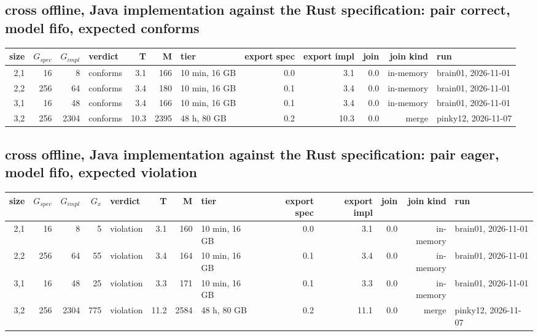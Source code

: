 \documentclass[10pt]{article}
\begin{document}
\subsection*{cross offline, Java implementation against the Rust specification: pair \textsf{correct}, model fifo, expected conforms}
\begin{longtable}{@{}rrrlrrlrrrrl@{}}
\toprule
size & $G_{\mathit{spec}}$ & $G_{\mathit{impl}}$ & verdict & T & M & tier & export spec & export impl & join & join kind & run \\
\midrule
\endhead
\color{red} 2,1 & 16 & 8 & conforms & 3.1 & 166 & 10 min, 16 GB & 0.0 & 3.1 & 0.0 & in-memory & brain01, 2026-11-01 \\
\color{red} 2,2 & 256 & 64 & conforms & 3.4 & 180 & 10 min, 16 GB & 0.1 & 3.4 & 0.0 & in-memory & brain01, 2026-11-01 \\
\color{red} 3,1 & 16 & 48 & conforms & 3.4 & 166 & 10 min, 16 GB & 0.1 & 3.4 & 0.0 & in-memory & brain01, 2026-11-01 \\
\color{red} 3,2 & 256 & 2304 & conforms & 10.3 & 2395 & 48 h, 80 GB & 0.2 & 10.3 & 0.0 & merge & pinky12, 2026-11-07 \\
\bottomrule
\end{longtable}
\subsection*{cross offline, Java implementation against the Rust specification: pair \textsf{eager}, model fifo, expected violation}
\begin{longtable}{@{}rrrrlrrlrrrrl@{}}
\toprule
size & $G_{\mathit{spec}}$ & $G_{\mathit{impl}}$ & $G_x$ & verdict & T & M & tier & export spec & export impl & join & join kind & run \\
\midrule
\endhead
\color{red} 2,1 & 16 & 8 & 5 & violation & 3.1 & 160 & 10 min, 16 GB & 0.0 & 3.1 & 0.0 & in-memory & brain01, 2026-11-01 \\
\color{red} 2,2 & 256 & 64 & 55 & violation & 3.4 & 164 & 10 min, 16 GB & 0.1 & 3.4 & 0.0 & in-memory & brain01, 2026-11-01 \\
\color{red} 3,1 & 16 & 48 & 25 & violation & 3.3 & 171 & 10 min, 16 GB & 0.1 & 3.3 & 0.0 & in-memory & brain01, 2026-11-01 \\
\color{red} 3,2 & 256 & 2304 & 775 & violation & 11.2 & 2584 & 48 h, 80 GB & 0.2 & 11.1 & 0.0 & merge & pinky12, 2026-11-07 \\
\bottomrule
\end{longtable}
\end{document}
